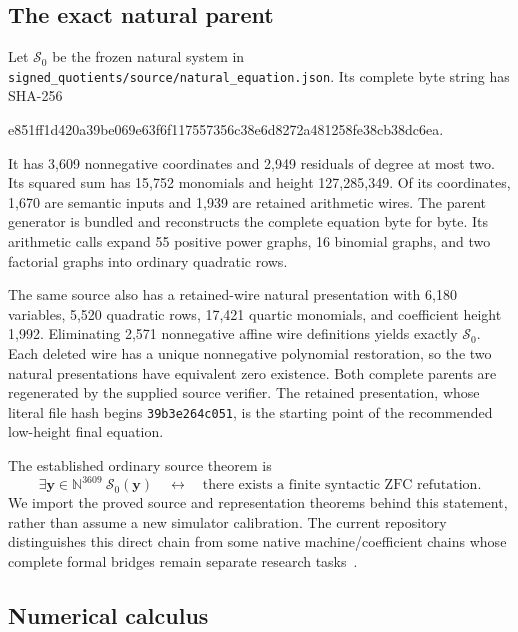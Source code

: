 \documentclass[11pt,letterpaper]{article}
\theoremstyle{definition}
\newcommand{\N}{\mathbb N}
\begin{document}
\subsection{The exact natural parent}

Let $\mathcal S_0$ be the frozen natural system in
\texttt{signed\_quotients/source/natural\_equation.json}. Its complete byte string has
SHA-256
\begin{center}\small\ttfamily
e851ff1d420a39be069e63f6f117557356c38e6d8272a481258fe38cb38dc6ea.
\end{center}
It has 3,609 nonnegative coordinates and 2,949 residuals of degree at most
two. Its squared sum has 15,752 monomials and height 127,285,349. Of its
coordinates, 1,670 are semantic inputs and 1,939 are retained arithmetic
wires. The parent generator is bundled and reconstructs the complete
equation byte for byte. Its arithmetic calls expand 55 positive power
graphs, 16 binomial graphs, and two factorial graphs into ordinary
quadratic rows.

The same source also has a retained-wire natural presentation with
6,180 variables, 5,520 quadratic rows, 17,421 quartic monomials, and
coefficient height 1,992. Eliminating 2,571 nonnegative affine wire
definitions yields exactly $\mathcal S_0$. Each deleted wire has a
unique nonnegative polynomial restoration, so the two natural
presentations have equivalent zero existence. Both complete parents
are regenerated by the supplied source verifier. The retained
presentation, whose literal file hash begins \texttt{39b3e264c051},
is the starting point of the recommended low-height final equation.

The established ordinary source theorem is
\begin{equation}
\label{eq:parent-correctness}
\exists\boldsymbol y\in\N^{3609}\ \mathcal S_0(\boldsymbol y)
\quad\longleftrightarrow\quad
\text{there exists a finite syntactic ZFC refutation}.
\end{equation}
We import the proved source and representation theorems behind this
statement, rather than assume a new simulator calibration. The current
repository distinguishes this direct chain from some native
machine/coefficient chains whose complete formal bridges remain separate
research tasks~\cite{repo-direct-review,repo-shared-review}.

\subsection{Numerical calculus}
\end{document}
